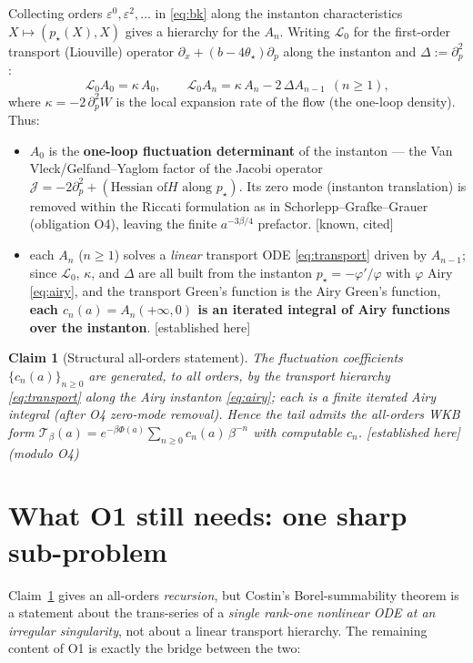 \documentclass[11pt,reqno]{amsart}
\theoremstyle{plain}
\newtheorem{claim}[proposition]{Claim}
\theoremstyle{remark}
\newcommand{\eps}{\varepsilon}
\newcommand{\OK}{{\footnotesize\textsf{[established here]}}}
\newcommand{\cited}{{\footnotesize\textsf{[known, cited]}}}
\begin{document}
Collecting orders $\eps^{0},\eps^{2},\dots$ in \eqref{eq:bk} along the instanton characteristics
$X\mapsto(p_\star(X),X)$ gives a hierarchy for the $A_n$. Writing $\mathcal L_0$ for the
first-order transport (Liouville) operator $\partial_x+(b-4\theta_\star)\partial_p$ along the
instanton and $\Delta:=\partial_p^2$:
\begin{equation}\label{eq:transport}
\mathcal L_0 A_0=\kappa\,A_0,\qquad \mathcal L_0 A_n=\kappa\,A_n-2\,\Delta A_{n-1}\ \ (n\ge1),
\end{equation}
where $\kappa=-2\,\partial_p^2W$ is the local expansion rate of the flow (the one-loop density).
Thus:
\begin{itemize}
\item $A_0$ is the \textbf{one-loop fluctuation determinant} of the instanton --- the Van
Vleck/Gelfand--Yaglom factor of the Jacobi operator $\mathcal J=-2\partial_p^2+(\text{Hessian of
$H$ along }p_\star)$. Its zero mode (instanton translation) is removed within the Riccati
formulation as in Schorlepp--Grafke--Grauer \cite{SGG} (obligation O4), leaving the finite
$a^{-3\beta/4}$ prefactor. \cited
\item each $A_n$ ($n\ge1$) solves a \emph{linear} transport ODE \eqref{eq:transport} driven by
$A_{n-1}$; since $\mathcal L_0$, $\kappa$, and $\Delta$ are all built from the instanton
$p_\star=-\varphi'/\varphi$ with $\varphi$ Airy \eqref{eq:airy}, and the transport Green's
function is the Airy Green's function, \textbf{each $c_n(a)=A_n(+\infty,0)$ is an iterated
integral of Airy functions over the instanton}. \OK
\end{itemize}

\begin{claim}[Structural all-orders statement]\label{cl:struct}
The fluctuation coefficients $\{c_n(a)\}_{n\ge0}$ are generated, to all orders, by the transport
hierarchy \eqref{eq:transport} along the Airy instanton \eqref{eq:airy}; each is a finite iterated
Airy integral (after O4 zero-mode removal). Hence the tail admits the all-orders WKB form
$\mathcal T_\beta(a)=e^{-\beta\Phi(a)}\sum_{n\ge0}c_n(a)\,\beta^{-n}$ with computable $c_n$.
\OK\,(modulo O4)
\end{claim}

\section{What O1 still needs: one sharp sub-problem}

Claim~\ref{cl:struct} gives an all-orders \emph{recursion}, but Costin's Borel-summability theorem
\cite{Costin} is a statement about the trans-series of a \emph{single rank-one nonlinear ODE at an
irregular singularity}, not about a linear transport hierarchy. The remaining content of O1 is
exactly the bridge between the two:
\end{document}
